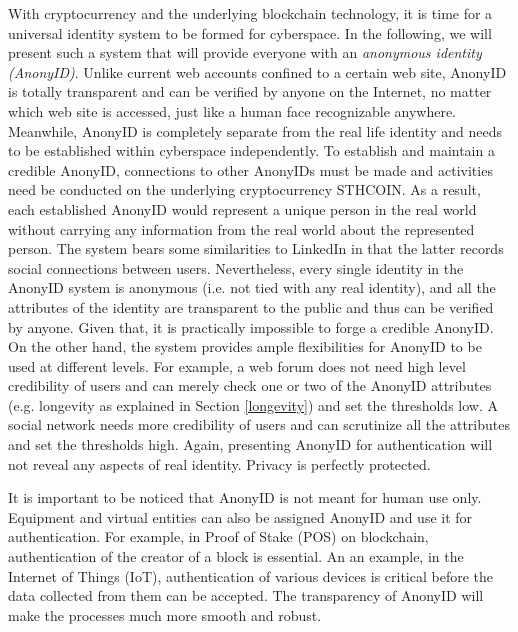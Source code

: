 \documentclass[12pt, a4paper]{article}
\begin{document}
With cryptocurrency and the underlying blockchain technology, it is time for a universal identity system to be formed for cyberspace. In the following, we will present such a system that will provide everyone with an \textit{anonymous identity (AnonyID)}. Unlike current web accounts confined to a certain web site, AnonyID is totally transparent and can be verified by anyone on the Internet, no matter which web site is accessed, just like a human face recognizable anywhere. Meanwhile, AnonyID is completely separate from the real life identity and needs to be established within cyberspace independently. To establish and maintain a credible AnonyID, connections to other AnonyIDs must be made and activities need be conducted on the underlying cryptocurrency STHCOIN. As a result, each established AnonyID would represent a unique person in the real world without carrying any information from the real world about the represented person. The system bears some similarities to LinkedIn in that the latter records social connections between users. Nevertheless, every single identity in the AnonyID system is anonymous (i.e. not tied with any real identity), and all the attributes of the identity are transparent to the public and thus can be verified by anyone. Given that, it is practically impossible to forge a credible AnonyID. On the other hand, the system provides ample flexibilities for AnonyID to be used at different levels. For example, a web forum does not need high level credibility of users and can merely check one or two of the AnonyID attributes (e.g. longevity as explained in Section \ref{longevity}) and set the thresholds low. A social network needs  more credibility of users and can scrutinize all the attributes and set the thresholds high. Again, presenting AnonyID for authentication will not reveal any aspects of real identity. Privacy is perfectly protected.

It is important to be noticed that AnonyID is not meant for human use only. Equipment and virtual entities can also be assigned AnonyID and use it for authentication. For example, in Proof of Stake (POS) on blockchain, authentication of the creator of a block is essential. An an example, in the Internet of Things (IoT), authentication of various devices is critical before the data collected from them can be accepted. The transparency of AnonyID will make the processes much more smooth and robust. 
\end{document}
